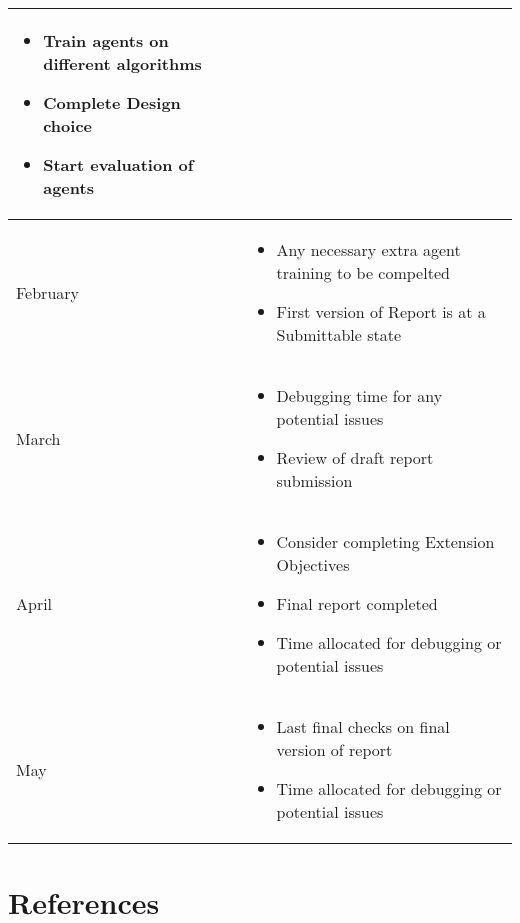 \documentclass{surrey_disso_style}
\begin{document}
\begin{center}
\begin{tabular}{|p{1.6cm}|p{13cm}|}
\begin{itemize}
      \item Train agents on different algorithms 
      \item Complete Design choice 
      \item Start evaluation of agents
   \end{itemize}\\
   \hline
   February & \begin{itemize}
      \item Any necessary extra agent training to be compelted
      \item First version of Report is at a Submittable state
   \end{itemize}\\
   \hline
   March & \begin{itemize}
      \item Debugging time for any potential issues 
      \item Review of draft report submission
   \end{itemize}\\
   \hline
   April & \begin{itemize}
      \item Consider completing Extension Objectives
      \item Final report completed 
      \item Time allocated for debugging or potential issues
   \end{itemize}\\
   \hline
   May & \begin{itemize}
      \item Last final checks on final version of report
      \item Time allocated for debugging or potential issues
   \end{itemize}\\
   \hline

\end{tabular}
\end{center}

\newpage


%
%

\section{References}
\printbibliography[heading=none]
\end{document}
